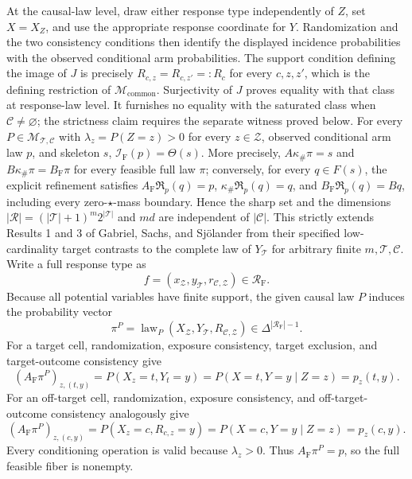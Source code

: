 At the causal-law level, draw either response type independently of \(Z\), set \(X=X_Z\), and use the appropriate response coordinate for \(Y\).  Randomization and the two consistency conditions then identify the displayed incidence probabilities with the observed conditional arm probabilities.  The support condition defining the image of \(J\) is precisely \(R_{c,z}=R_{c,z'}=:R_c\) for every \(c,z,z'\), which is the defining restriction of \(\mathcal M_{\mathrm{common}}\).  Surjectivity of \(J\) proves equality with that class at response-law level.  It furnishes no equality with the saturated class when \(\mathcal C\ne\varnothing\); the strictness claim requires the separate witness proved below.
For every \(P\in\mathcal M_{\mathcal T,\mathcal C}\) with \(\lambda_z=P(Z=z)>0\) for every \(z\in\mathcal Z\), observed conditional arm law \(p\), and skeleton \(s\), \(\mathcal I_{\mathrm F}(p)=\Theta(s)\). More precisely, \(A\kappa_{\#}\pi=s\) and \(B\kappa_{\#}\pi=B_{\mathrm F}\pi\) for every feasible full law \(\pi\); conversely, for every \(q\in F(s)\), the explicit refinement satisfies \(A_{\mathrm F}\mathfrak R_p(q)=p\), \(\kappa_{\#}\mathfrak R_p(q)=q\), and \(B_{\mathrm F}\mathfrak R_p(q)=Bq\), including every zero-\(\star\)-mass boundary. Hence the sharp set and the dimensions \(|\mathcal R|=(|\mathcal T|+1)^m2^{|\mathcal T|}\) and \(md\) are independent of \(|\mathcal C|\). This strictly extends Results 1 and 3 of Gabriel, Sachs, and Sj\"olander from their specified low-cardinality target contrasts to the complete law of \(Y_{\mathcal T}\) for arbitrary finite \(m,\mathcal T,\mathcal C\).
Write a full response type as
\[
f=(x_{\mathcal Z},y_{\mathcal T},r_{\mathcal C,\mathcal Z})
\in\mathcal R_{\mathrm F}.
\]
Because all potential variables have finite support, the given causal law \(P\) induces the probability vector
\[
\pi^P=\operatorname{law}_P(X_{\mathcal Z},Y_{\mathcal T},R_{\mathcal C,\mathcal Z})
\in\Delta^{|\mathcal R_{\mathrm F}|-1}.
\]
For a target cell, randomization, exposure consistency, target exclusion, and target-outcome consistency give
\[
(A_{\mathrm F}\pi^P)_{z,(t,y)}
=P(X_z=t,Y_t=y)
=P(X=t,Y=y\mid Z=z)
=p_z(t,y).
\]
For an off-target cell, randomization, exposure consistency, and off-target-outcome consistency analogously give
\[
(A_{\mathrm F}\pi^P)_{z,(c,y)}
=P(X_z=c,R_{c,z}=y)
=P(X=c,Y=y\mid Z=z)
=p_z(c,y).
\]
Every conditioning operation is valid because \(\lambda_z>0\).  Thus \(A_{\mathrm F}\pi^P=p\), so the full feasible fiber is nonempty.


